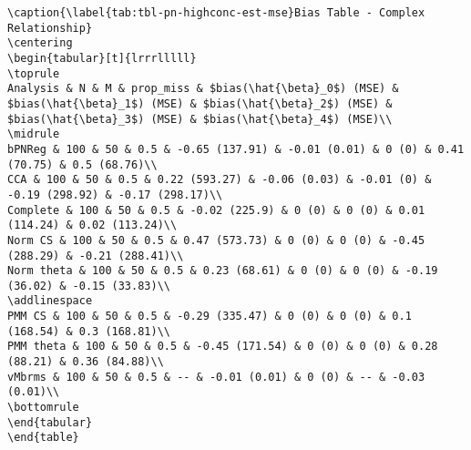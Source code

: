 \documentclass[
]{article}
\begin{document}
\begin{table}
\begin{minipage}[t]{\linewidth}
{\begin{verbatim}
\caption{\label{tab:tbl-pn-highconc-est-mse}Bias Table - Complex Relationship}
\centering
\begin{tabular}[t]{lrrrlllll}
\toprule
Analysis & N & M & prop_miss & $bias(\hat{\beta}_0$) (MSE) & $bias(\hat{\beta}_1$) (MSE) & $bias(\hat{\beta}_2$) (MSE) & $bias(\hat{\beta}_3$) (MSE) & $bias(\hat{\beta}_4$) (MSE)\\
\midrule
bPNReg & 100 & 50 & 0.5 & -0.65 (137.91) & -0.01 (0.01) & 0 (0) & 0.41 (70.75) & 0.5 (68.76)\\
CCA & 100 & 50 & 0.5 & 0.22 (593.27) & -0.06 (0.03) & -0.01 (0) & -0.19 (298.92) & -0.17 (298.17)\\
Complete & 100 & 50 & 0.5 & -0.02 (225.9) & 0 (0) & 0 (0) & 0.01 (114.24) & 0.02 (113.24)\\
Norm CS & 100 & 50 & 0.5 & 0.47 (573.73) & 0 (0) & 0 (0) & -0.45 (288.29) & -0.21 (288.41)\\
Norm theta & 100 & 50 & 0.5 & 0.23 (68.61) & 0 (0) & 0 (0) & -0.19 (36.02) & -0.15 (33.83)\\
\addlinespace
PMM CS & 100 & 50 & 0.5 & -0.29 (335.47) & 0 (0) & 0 (0) & 0.1 (168.54) & 0.3 (168.81)\\
PMM theta & 100 & 50 & 0.5 & -0.45 (171.54) & 0 (0) & 0 (0) & 0.28 (88.21) & 0.36 (84.88)\\
vMbrms & 100 & 50 & 0.5 & -- & -0.01 (0.01) & 0 (0) & -- & -0.03 (0.01)\\
\bottomrule
\end{tabular}
\end{table}
\end{verbatim}

}

\end{minipage}%

\end{table}
\end{document}
